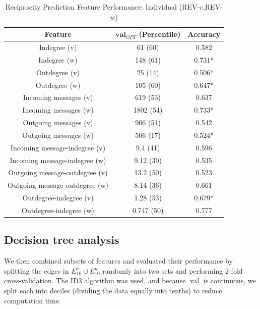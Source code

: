 \documentclass[conference]{IEEEtran}
\begin{document}
\begin{table}[!t]
\renewcommand{\arraystretch}{1.3}
\caption{Reciprocity Prediction Feature Performance: Individual (REV-$v$,REV-$w$)}
\label{table_recresults_indivVW}
\centering
\begin{tabular}{|c||c|c|}
\hline
\bf{Feature} & $\mathbf{val}_{OPT}$ (Percentile) & \bf{Accuracy} \\
\hline
Indegree (v) &  61 (60) & 0.582 \\
Indegree (w) & 148 (61) & 0.731* \\
Outdegree (v) & 25 (14) & 0.506* \\
Outdegree (w) & 105 (60) & 0.647* \\
\hline
Incoming messages (v) & 619 (53) & 0.637 \\
Incoming messages (w) & 1802 (54) & 0.733* \\
Outgoing messages (v) & 906 (51) & 0.542 \\
Outgoing messages (w) & 506 (17) & 0.524* \\
\hline
Incoming message-indegree (v) & 9.4 (41) & 0.596 \\
Incoming message-indegree (w) & 9.12 (30) & 0.535 \\
Outgoing message-outdegree (v) & 13.2 (50) & 0.523 \\
Outgoing message-outdegree (w) & 8.14 (36) & 0.661 \\
\hline
Outdegree-indegree (v) & 1.28 (53) & 0.679* \\
Outdegree-indegree (w) & 0.747 (50) & 0.777 \\
\hline
\end{tabular}
\end{table}

\subsection{Decision tree analysis}

We then combined subsets of features and evaluated their performance by splitting the edges in $E^r_{10} \cup E_{10}^u$ randomly into two sets and performing 2-fold cross-validation. The ID3 algorithm was used, and because $\operatorname{val}$ is continuous, we split each into deciles (dividing the data equally into tenths) to reduce computation time.
\end{document}
